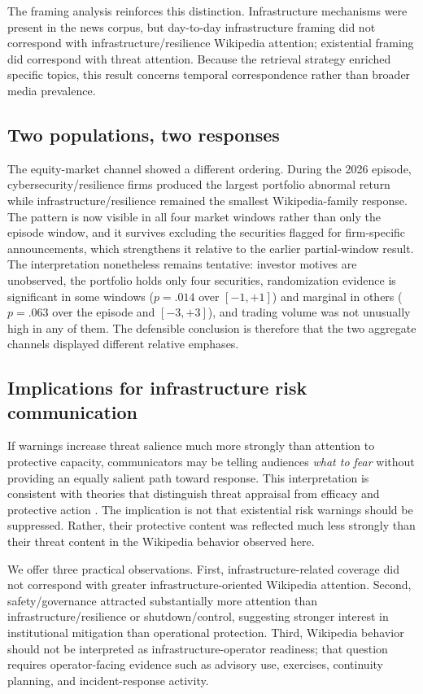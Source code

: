 \elsevierclasstrue\documentclass[preprint,12pt]{elsarticle}%
\begin{document}
The framing analysis reinforces this distinction. Infrastructure mechanisms were present in the news corpus, but day-to-day infrastructure framing did not correspond with infrastructure/resilience Wikipedia attention; existential framing did correspond with threat attention. Because the retrieval strategy enriched specific topics, this result concerns temporal correspondence rather than broader media prevalence.


\subsection{Two populations, two responses}

The equity-market channel showed a different ordering. During the 2026 episode, cybersecurity/resilience firms produced the largest portfolio abnormal return while infrastructure/resilience remained the smallest Wikipedia-family response. The pattern is now visible in all four market windows rather than only the episode window, and it survives excluding the securities flagged for firm-specific announcements, which strengthens it relative to the earlier partial-window result. The interpretation nonetheless remains tentative: investor motives are unobserved, the portfolio holds only four securities, randomization evidence is significant in some windows ($p=.014$ over $[-1,+1]$) and marginal in others ($p=.063$ over the episode and $[-3,+3]$), and trading volume was not unusually high in any of them. The defensible conclusion is therefore that the two aggregate channels displayed different relative emphases.


\subsection{Implications for infrastructure risk communication}

If warnings increase threat salience much more strongly than attention to protective capacity, communicators may be telling audiences \textit{what to fear} without providing an equally salient path toward response. This interpretation is consistent with theories that distinguish threat appraisal from efficacy and protective action \citep{witte1992eppm,kahlor2010prism}. The implication is not that existential risk warnings should be suppressed. Rather, their protective content was reflected much less strongly than their threat content in the Wikipedia behavior observed here.

We offer three practical observations. First, infrastructure-related coverage did not correspond with greater infrastructure-oriented Wikipedia attention. Second, safety/governance attracted substantially more attention than infrastructure/resilience or shutdown/control, suggesting stronger interest in institutional mitigation than operational protection. Third, Wikipedia behavior should not be interpreted as infrastructure-operator readiness; that question requires operator-facing evidence such as advisory use, exercises, continuity planning, and incident-response activity.
\end{document}
